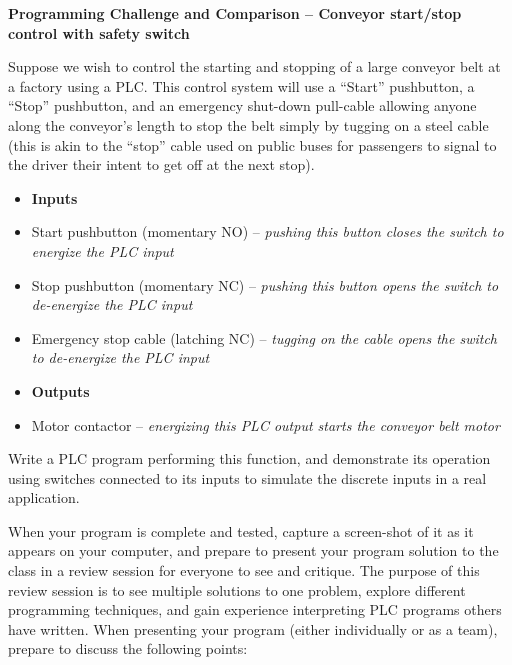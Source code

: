 

\noindent
{\bf Programming Challenge and Comparison -- Conveyor start/stop control with safety switch} 

\vskip 10pt

Suppose we wish to control the starting and stopping of a large conveyor belt at a factory using a PLC.  This control system will use a ``Start'' pushbutton, a ``Stop'' pushbutton, and an emergency shut-down pull-cable allowing anyone along the conveyor's length to stop the belt simply by tugging on a steel cable (this is akin to the ``stop'' cable used on public buses for passengers to signal to the driver their intent to get off at the next stop).

\begin{itemize}
\item{} {\bf Inputs} 
\item{} Start pushbutton (momentary NO) -- {\it pushing this button closes the switch to energize the PLC input}
\item{} Stop pushbutton (momentary NC) -- {\it pushing this button opens the switch to de-energize the PLC input}
\item{} Emergency stop cable (latching NC) -- {\it tugging on the cable opens the switch to de-energize the PLC input}
\end{itemize}

\begin{itemize}
\item{} {\bf Outputs} 
\item{} Motor contactor -- {\it energizing this PLC output starts the conveyor belt motor}
\end{itemize}

Write a PLC program performing this function, and demonstrate its operation using switches connected to its inputs to simulate the discrete inputs in a real application.  

\vskip 10pt

When your program is complete and tested, capture a screen-shot of it as it appears on your computer, and prepare to present your program solution to the class in a review session for everyone to see and critique.  The purpose of this review session is to see multiple solutions to one problem, explore different programming techniques, and gain experience interpreting PLC programs others have written.  When presenting your program (either individually or as a team), prepare to discuss the following points:

